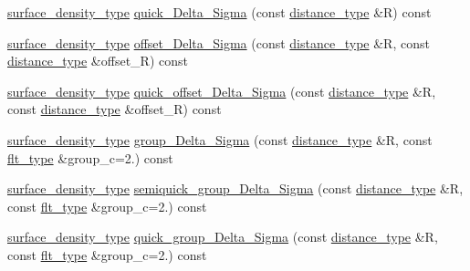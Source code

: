 \begin{DoxyCompactItemize}
\item 
\hyperlink{namespaceIceBRG_a80c597ef5ba0a32491d32a9f0083b02d}{surface\+\_\+density\+\_\+type} \hyperlink{classIceBRG_1_1lensing__profile__extension_a0b950e8cee7faf2c1e1c2bf64bf2cf75}{quick\+\_\+\+Delta\+\_\+\+Sigma} (const \hyperlink{namespaceIceBRG_a45499647eb87e24c10ab32c628711cec}{distance\+\_\+type} \&R) const 
\item 
\hyperlink{namespaceIceBRG_a80c597ef5ba0a32491d32a9f0083b02d}{surface\+\_\+density\+\_\+type} \hyperlink{classIceBRG_1_1lensing__profile__extension_aefc7c55a0d767a972361cad00b1d3719}{offset\+\_\+\+Delta\+\_\+\+Sigma} (const \hyperlink{namespaceIceBRG_a45499647eb87e24c10ab32c628711cec}{distance\+\_\+type} \&R, const \hyperlink{namespaceIceBRG_a45499647eb87e24c10ab32c628711cec}{distance\+\_\+type} \&offset\+\_\+\+R) const 
\item 
\hyperlink{namespaceIceBRG_a80c597ef5ba0a32491d32a9f0083b02d}{surface\+\_\+density\+\_\+type} \hyperlink{classIceBRG_1_1lensing__profile__extension_a8b0e5f63d78f8b5b1fe57ff3cd99b3bd}{quick\+\_\+offset\+\_\+\+Delta\+\_\+\+Sigma} (const \hyperlink{namespaceIceBRG_a45499647eb87e24c10ab32c628711cec}{distance\+\_\+type} \&R, const \hyperlink{namespaceIceBRG_a45499647eb87e24c10ab32c628711cec}{distance\+\_\+type} \&offset\+\_\+\+R) const 
\item 
\hyperlink{namespaceIceBRG_a80c597ef5ba0a32491d32a9f0083b02d}{surface\+\_\+density\+\_\+type} \hyperlink{classIceBRG_1_1lensing__profile__extension_a3d999f7604502abde8299dc8fb0fe6b0}{group\+\_\+\+Delta\+\_\+\+Sigma} (const \hyperlink{namespaceIceBRG_a45499647eb87e24c10ab32c628711cec}{distance\+\_\+type} \&R, const \hyperlink{lib_2IceBRG__main_2common_8h_ad0f130a56eeb944d9ef2692ee881ecc4}{flt\+\_\+type} \&group\+\_\+c=2.) const 
\item 
\hyperlink{namespaceIceBRG_a80c597ef5ba0a32491d32a9f0083b02d}{surface\+\_\+density\+\_\+type} \hyperlink{classIceBRG_1_1lensing__profile__extension_aa639895935b45fb171d5758d3964085d}{semiquick\+\_\+group\+\_\+\+Delta\+\_\+\+Sigma} (const \hyperlink{namespaceIceBRG_a45499647eb87e24c10ab32c628711cec}{distance\+\_\+type} \&R, const \hyperlink{lib_2IceBRG__main_2common_8h_ad0f130a56eeb944d9ef2692ee881ecc4}{flt\+\_\+type} \&group\+\_\+c=2.) const 
\item 
\hyperlink{namespaceIceBRG_a80c597ef5ba0a32491d32a9f0083b02d}{surface\+\_\+density\+\_\+type} \hyperlink{classIceBRG_1_1lensing__profile__extension_ae8f57fbc0c0cbc697d3973d831337295}{quick\+\_\+group\+\_\+\+Delta\+\_\+\+Sigma} (const \hyperlink{namespaceIceBRG_a45499647eb87e24c10ab32c628711cec}{distance\+\_\+type} \&R, const \hyperlink{lib_2IceBRG__main_2common_8h_ad0f130a56eeb944d9ef2692ee881ecc4}{flt\+\_\+type} \&group\+\_\+c=2.) const 

\end{DoxyCompactItemize}
